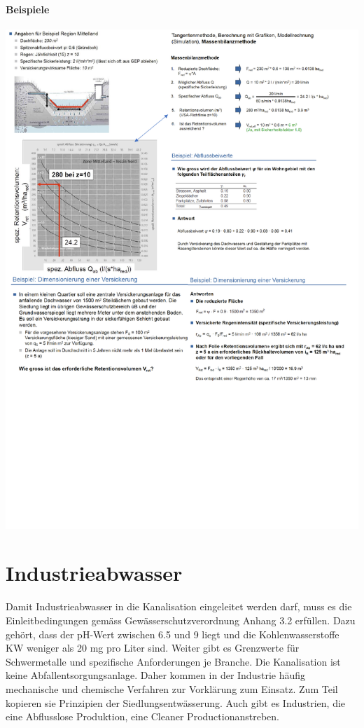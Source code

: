 \documentclass[9pt, openright=false]{scrartcl}
\begin{document}
\paragraph{Beispiele}
\begin{center}
\includegraphics[width=\textwidth]{images/bspversickerung}
\end{center}  
\section{Industrieabwasser} Damit Industrieabwasser in die Kanalisation eingeleitet werden darf, muss es die Einleitbedingungen gemäss Gewässerschutzverordnung Anhang 3.2 erfüllen. Dazu gehört, dass der pH-Wert zwischen 6.5 und 9 liegt und die Kohlenwasserstoffe KW weniger als 20 mg pro Liter sind. Weiter gibt es Grenzwerte für Schwermetalle und spezifische Anforderungen je Branche. Die Kanalisation ist keine Abfallentsorgungsanlage. Daher kommen in der Industrie häufig mechanische und chemische Verfahren zur Vorklärung zum Einsatz. Zum Teil kopieren sie Prinzipien der Siedlungsentwässerung. Auch gibt es Industrien, die eine Abflusslose Produktion, eine \glqq Cleaner Production\grqq anstreben.
\end{document}
